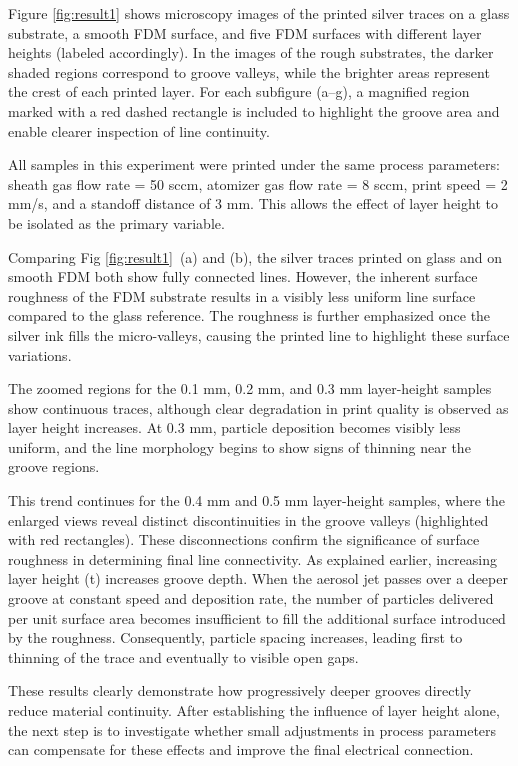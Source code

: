 \documentclass[subscriptcorrection,upint,varvw,balance,hyphenate]{asmejour}
\begin{document}
Figure \ref{fig:result1} shows microscopy images of the printed silver traces on a glass substrate, a smooth FDM surface, and five FDM surfaces with different layer heights (labeled accordingly). In the images of the rough substrates, the darker shaded regions correspond to groove valleys, while the brighter areas represent the crest of each printed layer. For each subfigure (a–g), a magnified region marked with a red dashed rectangle is included to highlight the groove area and enable clearer inspection of line continuity.

All samples in this experiment were printed under the same process parameters: sheath gas flow rate = 50 sccm, atomizer gas flow rate = 8 sccm, print speed = 2 mm/s, and a standoff distance of 3 mm. This allows the effect of layer height to be isolated as the primary variable.

Comparing Fig \ref{fig:result1}~(a) and (b), the silver traces printed on glass and on smooth FDM both show fully connected lines. However, the inherent surface roughness of the FDM substrate results in a visibly less uniform line surface compared to the glass reference. The roughness is further emphasized once the silver ink fills the micro-valleys, causing the printed line to highlight these surface variations.

The zoomed regions for the 0.1 mm, 0.2 mm, and 0.3 mm layer-height samples show continuous traces, although clear degradation in print quality is observed as layer height increases. At 0.3 mm, particle deposition becomes visibly less uniform, and the line morphology begins to show signs of thinning near the groove regions.

This trend continues for the 0.4 mm and 0.5 mm layer-height samples, where the enlarged views reveal distinct discontinuities in the groove valleys (highlighted with red rectangles). These disconnections confirm the significance of surface roughness in determining final line connectivity. As explained earlier, increasing layer height (t) increases groove depth. When the aerosol jet passes over a deeper groove at constant speed and deposition rate, the number of particles delivered per unit surface area becomes insufficient to fill the additional surface introduced by the roughness. Consequently, particle spacing increases, leading first to thinning of the trace and eventually to visible open gaps.

These results clearly demonstrate how progressively deeper grooves directly reduce material continuity. After establishing the influence of layer height alone, the next step is to investigate whether small adjustments in process parameters can compensate for these effects and improve the final electrical connection.
\end{document}
